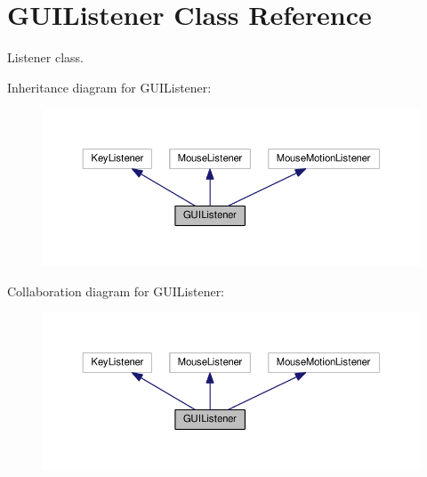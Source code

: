 \hypertarget{classGUIListener}{}\section{G\+U\+I\+Listener Class Reference}
\label{classGUIListener}


Listener class.  




Inheritance diagram for G\+U\+I\+Listener\+:
\nopagebreak
\begin{figure}[H]
\begin{center}
\leavevmode
\includegraphics[width=350pt]{classGUIListener__inherit__graph}
\end{center}
\end{figure}


Collaboration diagram for G\+U\+I\+Listener\+:
\nopagebreak
\begin{figure}[H]
\begin{center}
\leavevmode
\includegraphics[width=350pt]{classGUIListener__coll__graph}
\end{center}
\end{figure}
